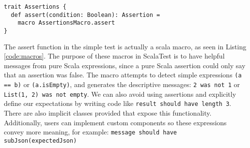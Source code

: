 \begin{lstlisting}[caption=Macros, label=code:macros, float]
trait Assertions {
  def assert(condition: Boolean): Assertion =
    macro AssertionsMacro.assert
}
\end{lstlisting}

The assert function in the simple test is actually a scala macro, as seen in Listing \ref{code:macros}.
The purpose of these macros in ScalaTest is to have helpful messages from pure Scala expressions, since a pure Scala assertion could only say that an assertion was false.
The macro attempts to detect simple expressions \texttt{(a == b)} or \texttt{(a.isEmpty)}, and generates the descriptive messages: \texttt{2 was not 1} or \texttt{List(1, 2) was not empty}.
We can also avoid using assertions and explicitly define our expectations by writing code like \texttt{result should have length 3}.
There are also implicit classes provided that expose this functionality.
Additionally, users can implement custom components so these expressions convey more meaning, for example: \texttt{message should have subJson(expectedJson)}
